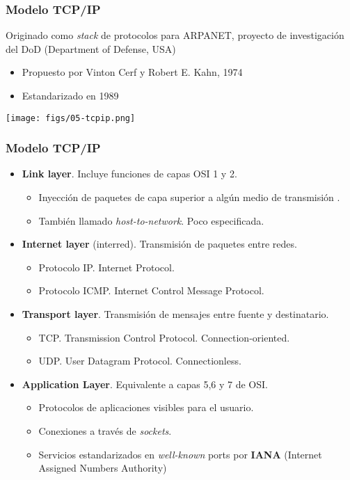 \documentclass[letter]{beamer}
\begin{document}
\begin{frame}
  \frametitle{Modelo TCP/IP}

  Originado como {\em stack} de protocolos para ARPANET, proyecto de investigación del DoD (Department of Defense, USA)
  \begin{itemize}
    \item Propuesto por Vinton Cerf y Robert E. Kahn, 1974
    \item Estandarizado en 1989
  \end{itemize}

  \begin{center}
    \texttt{[image: figs/05-tcpip.png]}
  \end{center}

\end{frame}
\begin{frame}
  \frametitle{Modelo TCP/IP}

  \begin{itemize}
    \item {\bf Link layer}. Incluye funciones de capas OSI 1 y 2.
      \begin{itemize}
        \item Inyección de paquetes de capa superior a algún medio de transmisión .
        \item También llamado {\em host-to-network}. Poco especificada.
      \end{itemize}
    \item {\bf Internet layer} (interred). Transmisión de paquetes entre redes.
      \begin{itemize}
        \item Protocolo IP. Internet Protocol.
        \item Protocolo ICMP. Internet Control Message Protocol.
      \end{itemize}
    \item {\bf Transport layer}. Transmisión de mensajes entre fuente y destinatario.
      \begin{itemize}
        \item TCP. Transmission Control Protocol. Connection-oriented.
        \item UDP. User Datagram Protocol. Connectionless.
      \end{itemize}
    \item {\bf Application Layer}. Equivalente a capas 5,6 y 7 de OSI.
      \begin{itemize}
        \item Protocolos de aplicaciones visibles para el usuario.
        \item Conexiones a través de {\em sockets}.
        \item Servicios estandarizados en {\em well-known} ports por {\bf IANA} (Internet Assigned Numbers Authority)
      \end{itemize}
  \end{itemize}
\end{frame}
\end{document}
